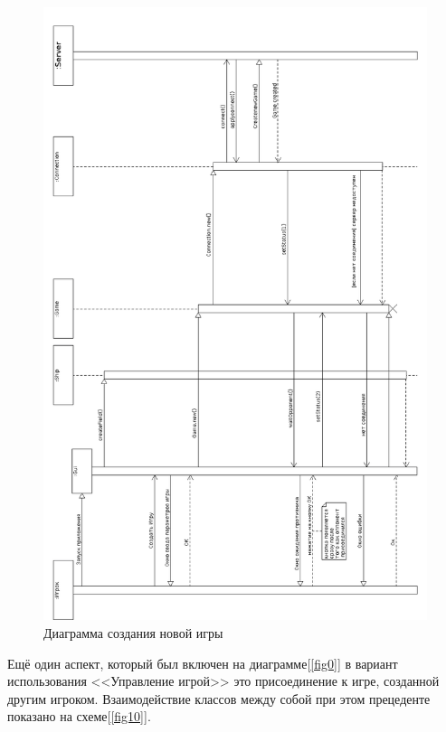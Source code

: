 \begin{figure}[pt]
\centering
\includegraphics[width=15cm]{images/CRG.png}
\caption{Диаграмма создания новой игры}
\label{fig9}
\end{figure}

\newpage
Ещё один аспект, который был включен на диаграмме[\ref{fig0}] в вариант использования <<Управление игрой>> это присоединение к игре, созданной другим игроком. Взаимодействие классов между собой при этом прецеденте показано на схеме[\ref{fig10}].

